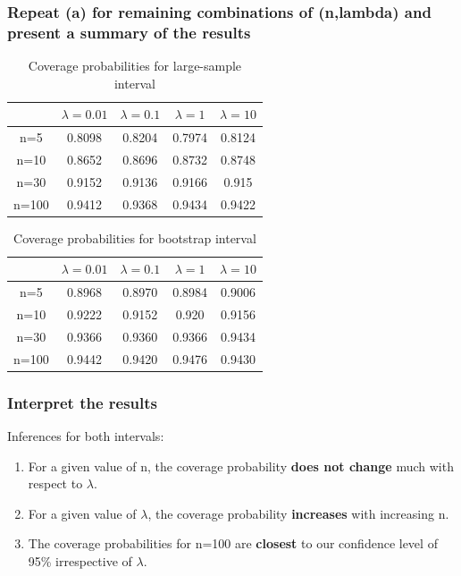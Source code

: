 \documentclass[12pt,letterpaper,titlepage,en-US]{article}
\begin{document}
\subsubsection{Repeat (a) for remaining combinations of (n,lambda) and present a summary of the results}
\begin{table}[H]
\centering
\begin{tabular}{|c|c|c|c|c|}
\hline
& $\lambda=0.01 $  &$\lambda=0.1 $   &$\lambda=1$    &$\lambda=10$ \\\hline
n=5	&0.8098 	 &0.8204	&  0.7974   & 0.8124\\\hline
n=10	&	0.8652 	&0.8696	&0.8732	&0.8748\\\hline
n=30	&0.9152 	&  0.9136 &0.9166	 &0.915 	\\\hline
n=100	& 0.9412 	&0.9368	 &0.9434	&0.9422\\\hline
\end{tabular}
\caption{Coverage probabilities for large-sample interval }\label{1}
\end{table}



\begin{table}[H]
\centering
\begin{tabular}{|c|c|c|c|c|}
\hline
& $\lambda=0.01 $  &$\lambda=0.1 $   &$\lambda=1$    &$\lambda=10$ \\\hline
n=5	&0.8968 	 & 0.8970	&  0.8984  &0.9006\\\hline
n=10	&0.9222 &0.9152 	&0.920	&0.9156\\\hline
n=30	&0.9366 	&0.9360	 &0.9366 	&0.9434\\\hline
n=100	&0.9442 	&0.9420	 &0.9476	&0.9430\\\hline
\end{tabular}
\caption{Coverage probabilities for bootstrap interval}\label{1}
\end{table}



\subsubsection{Interpret the results}
Inferences for both intervals:
\begin{enumerate}
\item For a given value of n, the coverage probability \textbf{does not change} much with respect to $\lambda$.
\item For a given value of $\lambda$, the coverage probability \textbf{increases} with increasing n. 
\item The coverage probabilities for n=100 are \textbf{closest} to our confidence level of 95\% irrespective of $\lambda$.
\end{enumerate}
\end{document}
